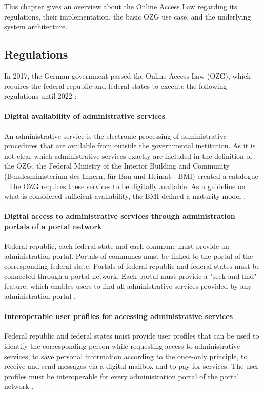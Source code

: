 This chapter gives an overview about the Online Access Law regarding its regulations, their implementation, the basic OZG use case, and the underlying system architecture.

\subsection{Regulations}

In 2017, the German government passed the Online Access Law (OZG), which requires the federal republic and federal states to execute the following regulations until 2022 \cite{ozg:regulations}:

\paragraph{Digital availability of administrative services} An administrative service is the electronic processing of administrative procedures that are available from outside the governmental institution.  As it is not clear which administrative services exactly are included in the definition of the OZG, the Federal Ministry of the Interior Building and Community (Bundesministerium des Innern, für Bau und Heimat - BMI) created a catalogue \cite{ozg:informationsplattform}. The OZG requires these services to be digitally available. As a guideline on what is considered sufficient availability, the BMI defined a maturity model \cite{ozg:maturity_model}.

\paragraph{Digital access to administrative services through administration portals of a portal network} Federal republic, each federal state and each commune must provide an administration portal. Portals of communes must be linked to the portal of the corresponding federal state. Portals of federal republic and federal states must be connected through a portal network. \cite{ozg:onlinegateway_general} Each portal must provide a "seek and find" feature, which enables users to find all administrative services provided by any administration portal \cite{ozg:onlinegateway_architecture}. 

\paragraph{Interoperable user profiles for accessing administrative services} Federal republic and federal states must provide user profiles that can be used to identify the corresponding person while requesting access to administrative services, to save personal information according to the once-only principle, to receive and send messages via a digital mailbox and to pay for services. The user profiles must be interoperable for every administration portal of the portal network \cite{ozg:user_profiles_general}.

